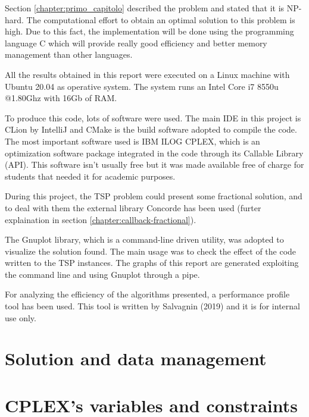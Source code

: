 Section \ref{chapter:primo_capitolo} described the problem and stated that it is NP-hard. The computational effort to obtain an optimal solution to this problem is high. Due to this fact, the implementation will be done using the programming language C which will provide really good efficiency and better memory management than other languages.

All the results obtained in this report were executed on a Linux machine with Ubuntu 20.04 as operative system. The system runs an Intel Core i7 8550u @1.80Ghz with 16Gb of RAM.

To produce this code, lots of software were used. The main IDE in this project is CLion by IntelliJ and CMake is the build software adopted to compile the code. The most important software used is IBM ILOG CPLEX, which is an optimization software package integrated in the code through its Callable Library (API). This software isn’t usually free but it was made available free of charge for students that needed it for academic purposes.

During this project, the TSP problem could present some fractional solution, and to deal with them the external library Concorde has been used (furter explaination in section \ref{chapter:callback-fractional}).

The Gnuplot library, which is a command-line driven utility, was adopted to visualize the solution found. The main usage was to check the effect of the code written to the TSP instances. The graphs of this report are generated exploiting the command line and using Gnuplot through a pipe.

For analyzing the efficiency of the algorithms presented, a performance profile tool has been used. This tool is written by Salvagnin (2019) and it is for internal use only.

\section{Solution and data management}



\section{CPLEX's variables and constraints}

